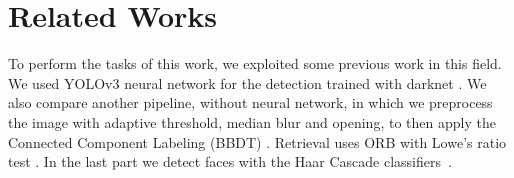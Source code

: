 \section{Related Works}
To perform the tasks of this work, we exploited some previous work in this field. We used YOLOv3 neural network \cite{yolov3} for the detection trained with darknet \cite{darknet}. We also compare another pipeline, without neural network, in which we preprocess the image with adaptive threshold, median blur \cite{median-blur} and opening, to then apply the Connected Component Labeling (BBDT) \cite{Grana_ccl}. Retrieval uses ORB \cite{orb} with Lowe's ratio test \cite{sift}. In the last part we detect faces with the Haar Cascade classifiers~\cite{haar_cascade}.
